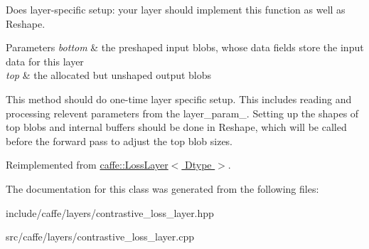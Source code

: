 Does layer-\/specific setup\+: your layer should implement this function as well as Reshape. 


\begin{DoxyParams}{Parameters}
{\em bottom} & the preshaped input blobs, whose data fields store the input data for this layer \\
\hline
{\em top} & the allocated but unshaped output blobs\\
\hline
\end{DoxyParams}
This method should do one-\/time layer specific setup. This includes reading and processing relevent parameters from the {\ttfamily layer\+\_\+param\+\_\+}. Setting up the shapes of top blobs and internal buffers should be done in {\ttfamily Reshape}, which will be called before the forward pass to adjust the top blob sizes. 

Reimplemented from \hyperlink{classcaffe_1_1LossLayer_a98084e06f7ca0e44c11aee5544379609}{caffe\+::\+Loss\+Layer$<$ Dtype $>$}.



The documentation for this class was generated from the following files\+:\begin{DoxyCompactItemize}
\item 
include/caffe/layers/contrastive\+\_\+loss\+\_\+layer.\+hpp\item 
src/caffe/layers/contrastive\+\_\+loss\+\_\+layer.\+cpp\end{DoxyCompactItemize}
